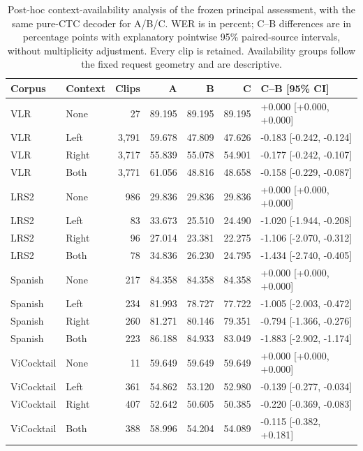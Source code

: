 \begin{table}[tb]
\centering\footnotesize
\setlength{\tabcolsep}{4pt}
\caption{Post-hoc context-availability analysis of the frozen principal assessment,
with the same pure-CTC decoder for A/B/C. WER is in percent; C--B differences
are in percentage points with explanatory pointwise 95\% paired-source
intervals, without multiplicity adjustment. Every clip is retained.
Availability groups follow the fixed request geometry and are descriptive.}
\label{tab:context-availability}
\begin{tabular}{llrrrrl}
\toprule
Corpus & Context & Clips & A & B & C & C--B [95\% CI] \\
\midrule
VLR & None & 27 & 89.195 & 89.195 & 89.195 & +0.000 [+0.000, +0.000] \\
VLR & Left & 3,791 & 59.678 & 47.809 & 47.626 & -0.183 [-0.242, -0.124] \\
VLR & Right & 3,717 & 55.839 & 55.078 & 54.901 & -0.177 [-0.242, -0.107] \\
VLR & Both & 3,771 & 61.056 & 48.816 & 48.658 & -0.158 [-0.229, -0.087] \\
LRS2 & None & 986 & 29.836 & 29.836 & 29.836 & +0.000 [+0.000, +0.000] \\
LRS2 & Left & 83 & 33.673 & 25.510 & 24.490 & -1.020 [-1.944, -0.208] \\
LRS2 & Right & 96 & 27.014 & 23.381 & 22.275 & -1.106 [-2.070, -0.312] \\
LRS2 & Both & 78 & 34.836 & 26.230 & 24.795 & -1.434 [-2.740, -0.405] \\
Spanish & None & 217 & 84.358 & 84.358 & 84.358 & +0.000 [+0.000, +0.000] \\
Spanish & Left & 234 & 81.993 & 78.727 & 77.722 & -1.005 [-2.003, -0.472] \\
Spanish & Right & 260 & 81.271 & 80.146 & 79.351 & -0.794 [-1.366, -0.276] \\
Spanish & Both & 223 & 86.188 & 84.933 & 83.049 & -1.883 [-2.902, -1.174] \\
ViCocktail & None & 11 & 59.649 & 59.649 & 59.649 & +0.000 [+0.000, +0.000] \\
ViCocktail & Left & 361 & 54.862 & 53.120 & 52.980 & -0.139 [-0.277, -0.034] \\
ViCocktail & Right & 407 & 52.642 & 50.605 & 50.385 & -0.220 [-0.369, -0.083] \\
ViCocktail & Both & 388 & 58.996 & 54.204 & 54.089 & -0.115 [-0.382, +0.181] \\
\bottomrule
\end{tabular}
\end{table}
